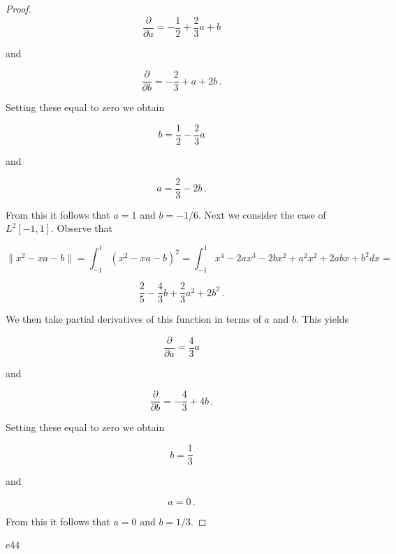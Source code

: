 \documentclass[a4paper]{article}
\numberwithin{equation}{section}
\begin{document}
\begin{description}
\begin{proof}
$$\frac{\partial}{\partial a} = - \frac{1}{2} + \frac{2}{3}a + b$$

and

$$\frac{\partial}{\partial b} = - \frac{2}{3} + a + 2b\,.$$

Setting these equal to zero we obtain

$$b =  \frac{1}{2} -\frac{2}{3}a$$

and

$$ a =  \frac{2}{3} - 2b\,.$$

From this it follows that $a = 1$ and $b = -1/6$. Next we consider the case of $L^2[-1,1]$. Observe that

$$\|x^2 - xa - b\| = \int_{-1}^1 (x^2 - xa - b)^2 = \int_{-1}^1 x^4 -2ax^3 -2bx^2+a^2x^2+2abx+b^2 dx = $$

$$\frac{2}{5} - \frac{4}{3}b + \frac{2}{3}a^2 + 2b^2\,.$$

We then take partial derivatives of this function in terms of $a$ and $b$. This yields

$$\frac{\partial}{\partial a} = \frac{4}{3}a$$

and

$$\frac{\partial}{\partial b} = - \frac{4}{3} + 4b\,.$$

Setting these equal to zero we obtain

$$b =  \frac{1}{3}$$

and

$$ a =  0\,.$$

From this it follows that $a = 0$ and $b = 1/3$.

\end{proof}
e44
\end{description}
\end{document}
